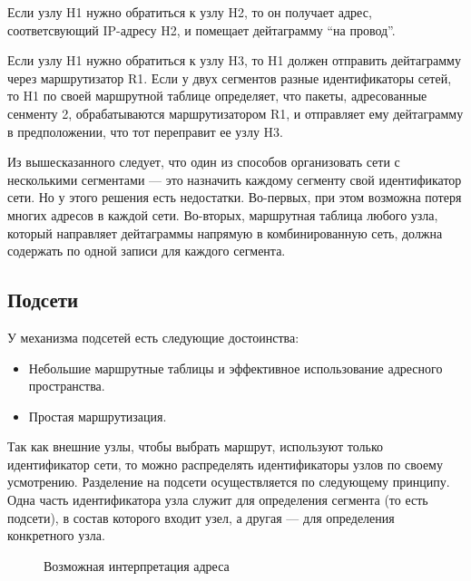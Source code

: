 Если узлу H1 нужно обратиться к узлу H2, то он получает адрес, соответсвующий IP-адресу H2, и помещает дейтаграмму ``на провод''.

Если узлу H1 нужно обратиться к узлу H3, то H1 должен отправить дейтаграмму через маршрутизатор R1. Если у двух сегментов разные идентификаторы сетей, то H1 по своей маршрутной таблице определяет, что пакеты, адресованные сенменту 2, обрабатываются маршрутизатором R1, и отправляет ему дейтаграмму в предположении, что тот переправит ее узлу H3.

Из вышесказанного следует, что один из способов организовать сети с несколькими сегментами --- это назначить каждому сегменту свой идентификатор сети. Но у этого решения есть недостатки. Во-первых, при этом возможна потеря многих адресов в каждой сети. Во-вторых, маршрутная таблица любого узла, который направляет дейтаграммы напрямую в комбинированную сеть, должна содержать по одной записи для каждого сегмента.

\subsection{Подсети}
У механизма подсетей есть следующие достоинства:
\begin{itemize}
  \item Небольшие маршрутные таблицы и эффективное использование адресного пространства.
  \item Простая маршрутизация.
\end{itemize}

Так как внешние узлы, чтобы выбрать маршрут, используют только идентификатор сети, то можно распределять идентификаторы узлов по своему усмотрению. Разделение на подсети осуществляется по следующему принципу. Одна часть идентификатора узла служит для определения сегмента (то есть подсети), в состав которого входит узел, а другая --- для определения конкретного узла.

\noindent
\begin{figure}[h!]
  \centering
  \caption{Возможная интерпретация адреса}
\end{figure}

